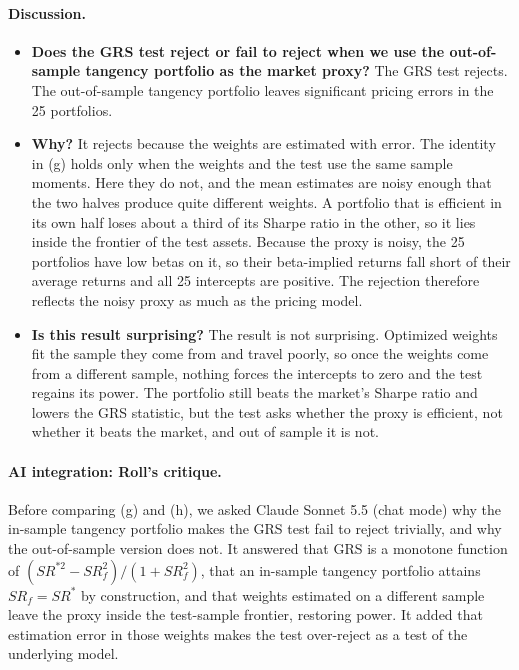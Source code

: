 \paragraph{Discussion.}
\begin{itemize}
\setlength{\itemsep}{4pt}\setlength{\parskip}{0pt}

\item \textbf{Does the GRS test reject or fail to reject when we use the
out-of-sample tangency portfolio as the market proxy?} The GRS test rejects.
The out-of-sample tangency portfolio
leaves significant pricing errors in the 25 portfolios.

\item \textbf{Why?} It rejects because the weights are estimated with
error.
The identity in (g) holds only when the weights and the test use the same
sample moments. Here they do not, and the mean estimates are noisy enough
that the two halves produce quite different weights. A portfolio that is
efficient in its own half loses about a third of its Sharpe ratio in the
other, so it lies inside the frontier of the test assets. Because the proxy is noisy, the 25 portfolios have low betas on it, so their beta-implied returns fall short of their average returns and all 25 intercepts are positive. The rejection therefore reflects the noisy proxy as much as the pricing model.

\item \textbf{Is this result surprising?} The result is not surprising.
Optimized weights fit the sample they come from and travel poorly, so once the weights come from a different sample, nothing forces the intercepts to zero and the test regains its power. The portfolio still beats the market's Sharpe ratio and
lowers the GRS statistic, but the test asks whether the proxy is efficient,
not whether it beats the market, and out of sample it is not.

\end{itemize}

\paragraph{AI integration: Roll's critique.} Before comparing (g) and (h),
we asked Claude Sonnet 5.5 (chat mode) why the in-sample tangency portfolio
makes the GRS test fail to reject trivially, and why the out-of-sample
version does not. It answered that GRS is a monotone function of
$(SR^{*2} - SR_f^2)/(1 + SR_f^2)$, that an in-sample tangency portfolio
attains $SR_f = SR^*$ by construction, and that weights estimated on a
different sample leave the proxy inside the test-sample frontier, restoring
power. It added that estimation error in those weights makes the test
over-reject as a test of the underlying model.

